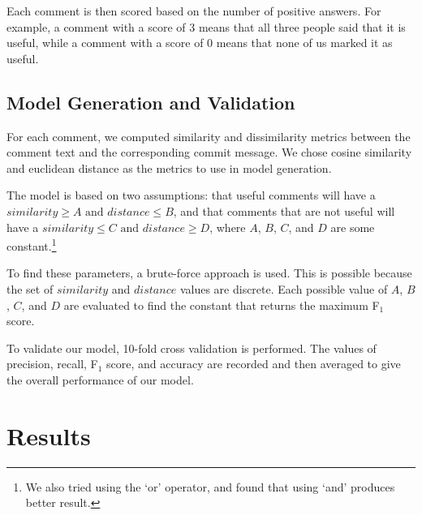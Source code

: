 \documentclass[conference]{IEEEtran}
\begin{document}
Each comment is then scored based on the number of positive answers.
For example, a comment with a score of 3 means that all three people said that it is useful,
while a comment with a score of 0 means that none of us marked it as useful.



\subsection{Model Generation and Validation}

For each comment, we computed similarity and dissimilarity metrics
between the comment text and the corresponding commit message.
We chose cosine similarity and euclidean distance as the metrics to use in model generation.

The model is based on two assumptions: that useful comments will have a $similarity \geq A \text{ and } distance \leq B$,
and that comments that are not useful will have a $ similarity \leq C \text{ and } distance \geq D$,
where $A$, $B$, $C$, and $D$ are some constant.\footnote{We also tried using the `or' operator, and found that using `and' produces better result.}

To find these parameters, a brute-force approach is used.
This is possible because the set of $similarity$ and $distance$ values are discrete.
Each possible value of $A$, $B$, $C$, and $D$ are evaluated to find the constant that returns the maximum F$_1$ score.

To validate our model, 10-fold cross validation is performed.
The values of precision, recall, F$_1$ score, and accuracy are recorded and then averaged
to give the overall performance of our model.


\section{Results}
\end{document}
